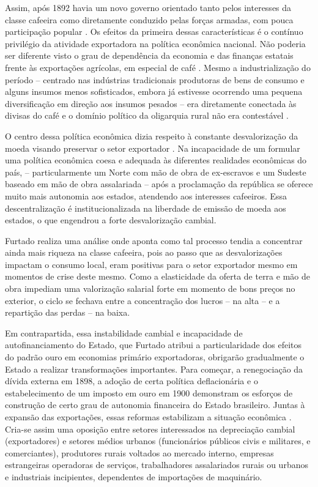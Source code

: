Assim, após 1892 havia um novo governo orientado tanto pelos interesses
da classe cafeeira
\citep{suzigan2000} como
diretamente conduzido pelas forças armadas, com pouca participação
popular \citep{pradojunior2012}. Os efeitos da primeira dessas características é o contínuo
privilégio da atividade exportadora na política econômica nacional. Não
poderia ser diferente visto o grau de dependência da economia e das
finanças estatais frente às exportações agrícolas, em especial de café
\citep{pradojunior2012}.
Mesmo a industrialização do período -- centrado nas indústrias
tradicionais produtoras de bens de consumo e alguns insumos menos
sofisticados, embora já estivesse ocorrendo uma pequena diversificação
em direção aos insumos pesados -- era diretamente conectada às divisas
do café e o domínio político da oligarquia rural não era contestável
\citep{suzigan2000}.

O centro dessa política econômica dizia respeito à constante
desvalorização da moeda visando preservar o setor exportador
\citep{furtado2005}. Na
incapacidade de um formular uma política econômica coesa e adequada às
diferentes realidades econômicas do país, -- particularmente um Norte
com mão de obra de ex-escravos e um Sudeste baseado em mão de obra
assalariada -- após a proclamação da república se oferece muito mais
autonomia aos estados, atendendo aos interesses cafeeiros. Essa
descentralização é institucionalizada na liberdade de emissão de moeda
aos estados, o que engendrou a forte desvalorização cambial.


Furtado \citeyearpar{furtado2005}
realiza uma análise onde aponta como tal processo tendia a concentrar
ainda mais riqueza na classe cafeeira, pois ao passo que as
desvalorizações impactam o consumo local, eram positivas para o setor
exportador mesmo em momentos de crise deste mesmo. Como a elasticidade
da oferta de terra e mão de obra impediam uma valorização salarial forte
em momento de bons preços no exterior, o ciclo se fechava entre a
concentração dos lucros -- na alta -- e a repartição das perdas -- na
baixa.

Em contrapartida, essa instabilidade cambial e incapacidade de
autofinanciamento do Estado, que Furtado
\citep{furtado2005}
atribui a particularidade dos efeitos do padrão ouro em economias
primário exportadoras, obrigarão gradualmente o Estado a realizar
transformações importantes. Para começar, a renegociação da dívida
externa em 1898, a adoção de certa política deflacionária e o
estabelecimento de um imposto em ouro em 1900
\citep{furtado2005}
demonstram os esforços de construção de certo grau de autonomia
financeira do Estado brasileiro. Juntas à expansão das exportações,
essas reformas estabilizam a situação econômica
\citep{furtado2005}.
Cria-se assim uma oposição entre setores interessados na depreciação
cambial (exportadores) e setores médios urbanos (funcionários públicos
civis e militares, e comerciantes), produtores rurais voltados ao
mercado interno, empresas estrangeiras operadoras de serviços,
trabalhadores assalariados rurais ou urbanos e industriais incipientes,
dependentes de importações de maquinário.

